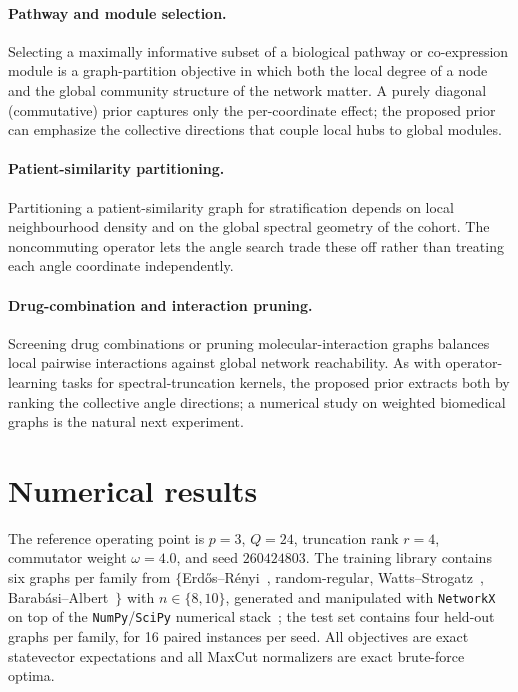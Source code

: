 \documentclass[aps,prresearch,reprint,amsmath,amssymb,floatfix,nofootinbib,superscriptaddress,longbibliography]{revtex4-2}
\theoremstyle{remark}
\begin{document}
\paragraph{Pathway and module selection.}
Selecting a maximally informative subset of a biological pathway or co-expression
module is a graph-partition objective in which both the local degree of a node and
the global community structure of the network matter.  A purely diagonal
(commutative) prior captures only the per-coordinate effect; the proposed prior
can emphasize the collective directions that couple local hubs to global modules.

\paragraph{Patient-similarity partitioning.}
Partitioning a patient-similarity graph for stratification depends on local
neighbourhood density and on the global spectral geometry of the cohort.  The
noncommuting operator lets the angle search trade these off rather than treating
each angle coordinate independently.

\paragraph{Drug-combination and interaction pruning.}
Screening drug combinations or pruning molecular-interaction graphs balances
local pairwise interactions against global network reachability.  As with
operator-learning tasks for spectral-truncation kernels, the proposed prior
extracts both by ranking the collective angle directions; a numerical study on
weighted biomedical graphs is the natural next experiment.

\section{Numerical results}
\label{sec:numerical}

The reference operating point is \(p=3\), \(Q=24\), truncation rank \(r=4\),
commutator weight \(\omega=4.0\), and seed \(260424803\).  The training library
contains six graphs per family from
\(\{\)Erd\H{o}s--R\'enyi~\cite{erdos1959}, random-regular,
Watts--Strogatz~\cite{watts1998},
Barab\'asi--Albert~\cite{barabasi1999}\(\}\) with \(n\in\{8,10\}\), generated and
manipulated with \texttt{NetworkX}~\cite{hagberg2008} on top of the
\texttt{NumPy}/\texttt{SciPy} numerical
stack~\cite{harris2020,virtanen2020}; the test set contains four
held-out graphs per family, for 16 paired instances per seed.  All objectives are
exact statevector expectations and all MaxCut normalizers are exact brute-force
optima.
\end{document}
